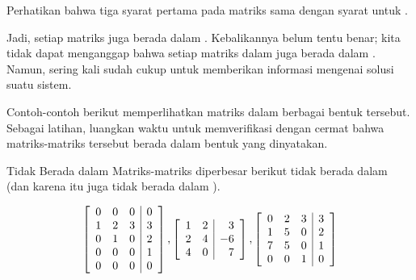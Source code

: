 Perhatikan bahwa tiga syarat pertama pada matriks \rref \;sama dengan syarat untuk \ef.


Jadi, setiap matriks \rref \;juga berada dalam \ef. Kebalikannya belum tentu benar;
 kita tidak dapat menganggap bahwa setiap matriks dalam \ef \;juga berada dalam \rref. Namun, sering kali
\ef \;sudah cukup untuk memberikan informasi mengenai solusi suatu sistem.

Contoh-contoh berikut memperlihatkan matriks dalam berbagai bentuk tersebut. Sebagai latihan, luangkan waktu
untuk memverifikasi dengan cermat bahwa matriks-matriks tersebut berada dalam bentuk yang dinyatakan.

\begin{example}{Tidak Berada dalam \EF}\label{exa:matricesnotechelon}
Matriks-matriks diperbesar berikut tidak berada dalam \ef \;(dan karena itu juga tidak berada dalam \rref).

\begin{equation*}
\left[
\begin{array}{rrr|r}
0 & 0 & 0 & 0 \\
1 & 2 & 3 & 3 \\
0 & 1 & 0 & 2 \\
0 & 0 & 0 & 1 \\
0 & 0 & 0 & 0
\end{array}
\right] ,\left[
\begin{array}{rr|r}
1 & 2 & 3 \\
2 & 4 & -6 \\
4 & 0 & 7
\end{array}
\right] ,\left[
\begin{array}{rrr|r}
0 & 2 & 3 & 3 \\
1 & 5 & 0 & 2 \\
7 & 5 & 0 & 1 \\
0 & 0 & 1 & 0
\end{array}
\right] 
\end{equation*}
\end{example}

